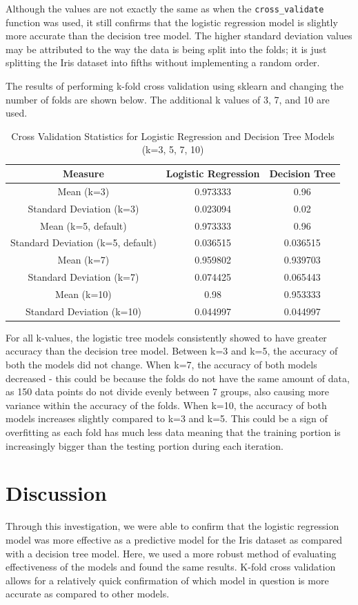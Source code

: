 \documentclass[journal]{IEEEtran}
\begin{document}
Although the values are not exactly the same as when the \lstinline{cross_validate} function was used, it still confirms that the logistic regression model is slightly more accurate than the decision tree model. The higher standard deviation values may be attributed to the way the data is being split into the folds; it is just splitting the Iris dataset into fifths without implementing a random order. 

The results of performing k-fold cross validation using sklearn and changing the number of folds are shown below. The additional k values of 3, 7, and 10 are used.

\begin{table}[h!]
\centering
\begin{tabular}{ c | c c }
Measure & Logistic Regression & Decision Tree \\
\hline
Mean (k=3) & 0.973333 & 0.96 \\
Standard Deviation (k=3)  & 0.023094 & 0.02 \\
Mean (k=5, default) & 0.973333 & 0.96 \\
Standard Deviation (k=5, default)  & 0.036515 & 0.036515 \\
Mean (k=7) & 0.959802 & 0.939703 \\
Standard Deviation (k=7)  & 0.074425 & 0.065443 \\
Mean (k=10) & 0.98 & 0.953333 \\
Standard Deviation (k=10)  & 0.044997 & 0.044997 \\
\end{tabular}
\caption{Cross Validation Statistics for Logistic Regression and Decision Tree Models (k=3, 5, 7, 10)}
\label{table:MultiFoldCV}
\end{table}

For all k-values, the logistic tree models consistently showed to have greater accuracy than the decision tree model. Between k=3 and k=5, the accuracy of both the models did not change. When k=7, the accuracy of both models decreased - this could be because the folds do not have the same amount of data, as 150 data points do not divide evenly between 7 groups, also causing more variance within the accuracy of the folds. When k=10, the accuracy of both models increases slightly compared to k=3 and k=5. This could be a sign of overfitting as each fold has much less data meaning that the training portion is increasingly bigger than the testing portion during each iteration. 



\section{Discussion}
\label{sec:discussion}
Through this investigation, we were able to confirm that the logistic regression model was more effective as a predictive model for the Iris dataset as compared with a decision tree model. Here, we used a more robust method of evaluating effectiveness of the models and found the same results. K-fold cross validation allows for a relatively quick confirmation of which model in question is more accurate as compared to other models. 
\end{document}
